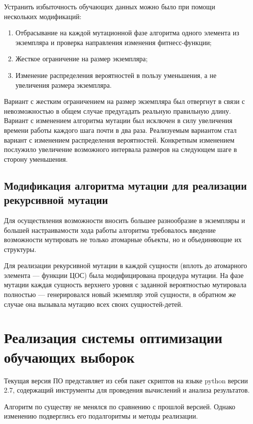 \documentclass[utf8,usehyperref,14pt]{G7-32}
\begin{document}
Устранить избыточность обучающих данных можно было при помощи нескольких модификаций:
\begin{enumerate}
\item Отбрасывание на каждой мутационной фазе алгоритма одного элемента из экземпляра и проверка направления изменения фитнесс-функции;
\item Жесткое ограничение на размер экземпляра;
\item Изменение распределения вероятностей в пользу уменьшения, а не увеличения размера экземпляра.
\end{enumerate}
Вариант с жестким ограничением на размер экземпляра был отвергнут в связи с невозможностью в общем случае предугадать реальную правильную длину. Вариант с изменением алгоритма мутации был исключен в силу увеличения времени работы каждого шага почти в два раза. Реализуемым вариантом стал вариант с изменением распределения вероятностей. Конкретным изменением послужило увеличение возможного интервала размеров на следующем шаге в сторону уменьшения.

\subsection{Модификация алгоритма мутации для реализации рекурсивной мутации}
Для осуществления возможности вносить большее разнообразие в экземпляры и большей настраивамости хода работы алгоритма требовалось введение возможности мутировать не только атомарные объекты, но и объединяющие их структуры.

Для реализации рекурсивной мутации в каждой сущности (вплоть до атомарного элемента --- функции ЦОС) была модифицирована процедура мутации. На фазе мутации каждая сущность верхнего уровня с заданной вероятностью мутировала полностью --- генерировался новый экземпляр этой сущности, в обратном же случае она вызывала мутацию всех своих сущностей-детей.

\section{Реализация системы оптимизации обучающих выборок}
Текущая версия ПО представляет из себя пакет скриптов на языке python версии 2.7, содержащий инструменты для проведения вычислений и анализа результатов.

Алгоритм по существу не менялся по сравнению с прошлой версией. Однако изменению подверглись его подалгоритмы и методы реализации.
\end{document}
